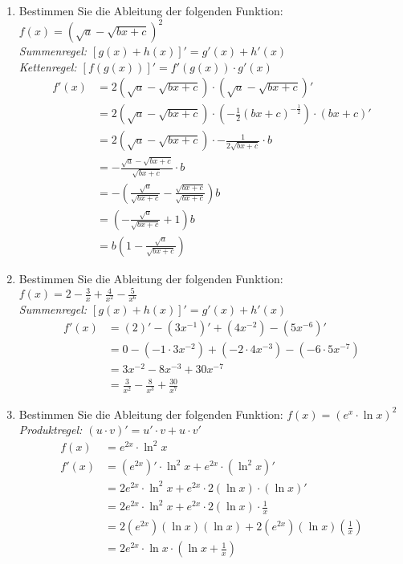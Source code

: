 \documentclass[12pt]{article}
\begin{document}
\begin{enumerate}[start=1,label={\bfseries Frage \arabic*:},leftmargin=1in]
    \item Bestimmen Sie die Ableitung der folgenden Funktion: $f(x)=(\sqrt{a} - \sqrt{bx+c})^2$ \\
    \textit{Summenregel: $[g(x )+ h(x)]' = g'(x) + h'(x)$} \\
    \textit{Kettenregel: $[f(g(x))]'=f'(g(x)) \cdot g'(x)$} \\
    \begin{align*}
        f'(x)&=2(\sqrt{a} - \sqrt{bx+c}) \cdot (\sqrt{a} - \sqrt{bx+c})' \\
        &= 2(\sqrt{a} - \sqrt{bx+c}) \cdot (-\frac{1}{2}(bx+c)^{-\frac{1}{2}}) \cdot (bx+c)' \\
        &= 2(\sqrt{a} - \sqrt{bx+c}) \cdot -\frac{1}{2\sqrt{bx+c}} \cdot b \\
        &= -\frac{\sqrt{a}-\sqrt{bx+c}}{\sqrt{bx+c}} \cdot b \\
        &= -(\frac{\sqrt{a}}{\sqrt{bx+c}} - \frac{\sqrt{bx+c}}{\sqrt{bx+c}})b \\
        &= (-\frac{\sqrt{a}}{\sqrt{bx+c}}+1)b \\
        &= b(1-\frac{\sqrt{a}}{\sqrt{bx+c}})
    \end{align*}

    \item Bestimmen Sie die Ableitung der folgenden Funktion: $f(x)=2 - \frac{3}{x} + \frac{4}{x^2} - \frac{5}{x^6}$ \\
    \textit{Summenregel: $[g(x )+ h(x)]' = g'(x) + h'(x)$} \\
    \begin{align*}
        f'(x)&=(2)' - (3x^{-1})' + (4x^{-2}) - (5x^{-6})' \\
        &= 0 - (-1 \cdot 3x^{-2}) + (-2 \cdot 4x^{-3}) - (-6 \cdot 5x^{-7}) \\
        &= 3x^{-2} - 8x^{-3} + 30x^{-7} \\
        &= \frac{3}{x^2} - \frac{8}{x^3} + \frac{30}{x^7}
    \end{align*}

    \item Bestimmen Sie die Ableitung der folgenden Funktion: $f(x)=(e^x \cdot \ln{x})^2$ \\
    \textit{Produktregel: $(u \cdot v)' = u' \cdot v + u \cdot v'$} \\
    \begin{align*}
        f(x)&=e^{2x} \cdot \ln^2{x} \\
        f'(x)&=(e^{2x})' \cdot \ln^2{x} + e^{2x} \cdot (\ln^2{x})' \\
        &= 2e^{2x} \cdot \ln^2{x} + e^{2x} \cdot 2(\ln{x}) \cdot (\ln{x})' \\
        &= 2e^{2x} \cdot \ln^2{x} + e^{2x} \cdot 2(\ln{x}) \cdot \frac{1}{x} \\
        &= 2 (e^{2x})(\ln{x})(\ln{x}) + 2 (e^{2x})(\ln{x})(\frac{1}{x}) \\
        &= 2e^{2x} \cdot \ln{x} \cdot (\ln{x} + \frac{1}{x})
    \end{align*}


\end{enumerate}
\end{document}
